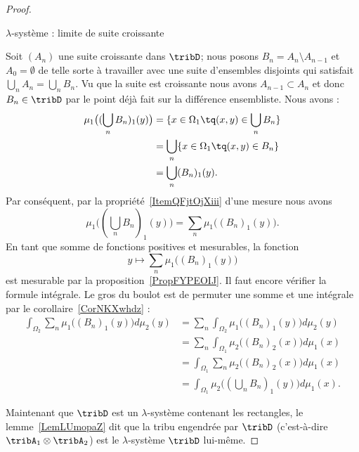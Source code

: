 \begin{proof}
\begin{subproof}
        \item[\( \lambda\)-système : limite de suite croissante]

            Soit \( (A_n)\) une suite croissante dans \( \tribD\); nous posons \( B_n=A_n\setminus A_{n-1}\) et \( A_0=\emptyset\) de telle sorte à travailler avec une suite d'ensembles disjoints qui satisfait \( \bigcup_nA_n=\bigcup_nB_n\). Vu que la suite est croissante nous avons \( A_{n-1}\subset A_n\) et donc \( B_n\in\tribD\) par le point déjà fait sur la différence ensembliste. Nous avons :
            \begin{subequations}
                \begin{align}
                    \mu_1\big( (\bigcup_nB_n)_1(y) \big)&=\{ x\in \Omega_1\tq (x,y)\in\bigcup_nB_n \}\\
                    &=\bigcup_n\{ x\in\Omega_1\tq (x,y)\in B_n \}\\
                    &=\bigcup_n (B_n)_1(y).
                \end{align}
            \end{subequations}
            Par conséquent, par la propriété~\ref{ItemQFjtOjXiii} d'une mesure nous avons
            \begin{equation}
                \mu_1\big( (\bigcup_nB_n)_1(y) \big)=\sum_n\mu_1\big( (B_n)_1(y) \big).
            \end{equation}
            En tant que somme de fonctions positives et mesurables, la fonction
            \begin{equation}
                y\mapsto\sum_n\mu_1\big( (B_n)_1(y) \big)
            \end{equation}
            est mesurable par la proposition~\ref{PropFYPEOIJ}. Il faut encore vérifier la formule intégrale. Le gros du boulot est de permuter une somme et une intégrale par le corollaire~\ref{CorNKXwhdz} :
            \begin{subequations}
                \begin{align}
                    \int_{\Omega_2}\sum_n\mu_1\big( (B_n)_1(y) \big)d\mu_2(y)&=\sum_n\int_{\Omega_2}\mu_1\big( (B_n)_1(y) \big)d\mu_2(y)\\
                    &=\sum_n\int_{\Omega_1}\mu_2\big( (B_n)_2(x) \big)d\mu_1(x)\\
                    &=\int_{\Omega_1}\sum_n\mu_2\big( (B_n)_2(x) \big)d\mu_1(x)\\
                    &=\int_{\Omega_1}\mu_2\big( (\bigcup_nB_n)_1(y) \big)d\mu_1(x).
                \end{align}
            \end{subequations}
    \end{subproof}
    Maintenant que \( \tribD\) est un $\lambda$-système contenant les rectangles, le lemme~\ref{LemLUmopaZ} dit que la tribu engendrée par \( \tribD\) (c'est-à-dire \( \tribA_1\otimes \tribA_2\)) est le $\lambda$-système \( \tribD\) lui-même.


\end{proof}
